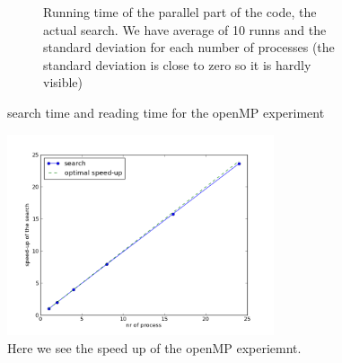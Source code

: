\documentclass[a4paper,10pt]{article}
\begin{document}
\begin{figure}[h!t]
\begin{subfigure}[b]{0.70\textwidth}
                \caption{Running time of the parallel part of the code, the actual search. 
                         We have average of 10 runns and the standard deviation for each number
                         of processes (the standard deviation is close to zero so it is hardly 
                         visible)}
                \label{fig:openmp_search}
        \end{subfigure}
        \caption{search time and reading time for the openMP experiment}
\end{figure}


\begin{figure}[htb]
  \centering
  \includegraphics[width=0.7\textwidth]{graphics/openmp17gb/search_speedup.png}
  \caption{Here we see the speed up of the openMP experiemnt.}
  \label{fig:openmp_speedup}
\end{figure}
\end{document}
